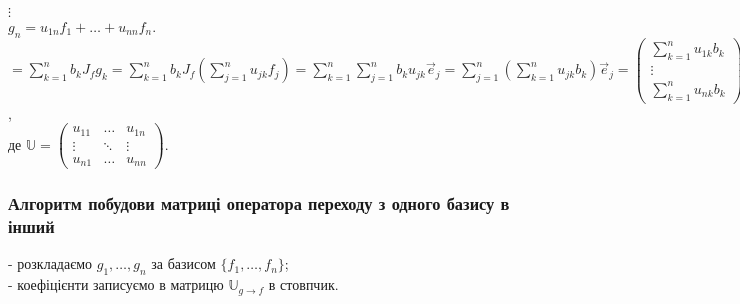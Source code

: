 \documentclass[a4paper, 10pt]{article}
\theoremstyle{theoremdd}
\begin{document}
$\vdots$\\
$g_n = u_{1n}f_1 + \dots + u_{nn}f_n$.\\
$\boxed{=} \displaystyle \sum_{k=1}^n b_k J_f g_k = \sum_{k=1}^n b_k J_f \left(\sum_{j=1}^n u_{jk} f_j\right) = \sum_{k=1}^n \sum_{j=1}^n b_k u_{jk} \vec{e}_j = \sum_{j=1}^n \left(\sum_{k=1}^n u_{jk} b_k \right) \vec{e}_j = \begin{pmatrix}
 \displaystyle \sum_{k=1}^n u_{1k} b_k \\ \vdots \\ \displaystyle \sum_{k=1}^n u_{nk} b_k
\end{pmatrix} = \mathbb{U} \vec{x}_g$,\\
де $\mathbb{U} = \begin{pmatrix}
u_{11} & \dots & u_{1n} \\
\vdots & \ddots & \vdots \\
u_{n1} & \dots & u_{nn}
\end{pmatrix}$.
\subsubsection*{Алгоритм побудови матриці оператора переходу з одного базису в інший}
- розкладаємо $g_1,\dots,g_n$ за базисом $\{f_1,\dots,f_n\}$;\\
- коефіцієнти записуємо в матрицю $\mathbb{U}_{g \to f}$ в стовпчик.
\end{document}
